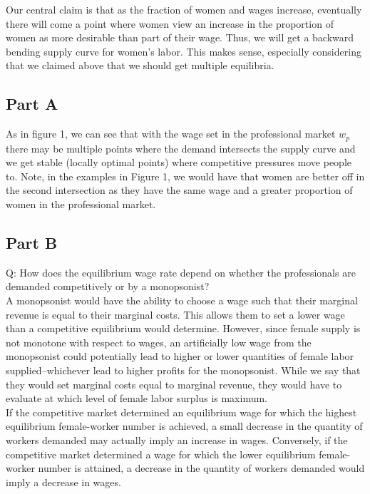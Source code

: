 \documentclass{article}
\begin{document}
Our central claim is that as the fraction of women and wages increase, eventually there will come a point where women view an increase in the proportion of women as more desirable than part of their wage. Thus, we will get a backward bending supply curve for women's labor. This makes sense, especially considering that we claimed above that we should get multiple equilibria.


\subsection*{Part A}
As in figure 1, we can see that with the wage set in the professional market $w_p$ there may be multiple points where the demand intersects the supply curve and we get stable (locally optimal points) where competitive pressures move people to. Note, in the examples in Figure 1, we would have that women are better off in the second intersection as they have the same wage and a greater proportion of women in the professional market. 
\\

\subsection*{Part B}
Q: How does the equilibrium wage rate depend on whether the professionals are demanded competitively or by a monopsonist?
\\

A monopsonist would have the ability to choose a wage such that their marginal revenue is equal to their marginal costs. This allows them to set a lower wage than a competitive equilibrium would determine. However, since female supply is not monotone with respect to wages, an artificially low wage from the monopsonist could potentially lead to higher or lower quantities of female labor supplied--whichever lead to higher profits for the monopsonist. While we say that they would set marginal costs equal to marginal revenue, they would have to evaluate at which level of female labor surplus is maximum.
\\

If the competitive market determined an equilibrium wage for which the highest equilibrium female-worker number is achieved, a small decrease in the quantity of workers demanded may actually imply an increase in wages. Conversely, if the competitive market determined a wage for which the lower equilibrium female-worker number is attained, a decrease in the quantity of workers demanded would imply a decrease in wages.
\end{document}
